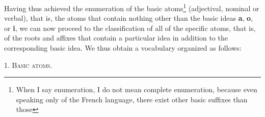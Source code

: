 \begin{sloppypar}
{    Having thus achieved the enumeration of the basic
    atoms\footnote{When I say enumeration, I do not mean complete
      enumeration, because even speaking only of the French language,
      there exist other basic suffixes than those} (adjectival,
    nominal or verbal), that is, the atoms that contain nothing other
    than the basic ideas \textbf{a}, \textbf{o}, or \textbf{i}, we can
    now proceed to the classification of all of the specific atoms,
    that is, of the roots and affixes that contain a particular idea
    in addition to the corresponding basic idea. We thus obtain a
    vocabulary organized as follows:

    \begin{center}
      1. \textsc{Basic atoms}.
    \end{center}

    \noindent
    }
\end{sloppypar}
